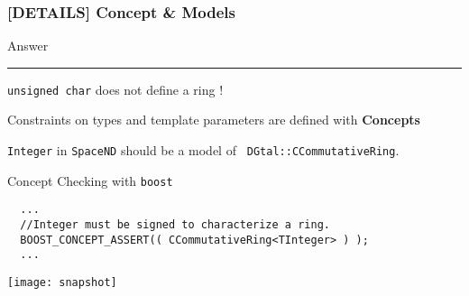 \documentclass[8pt]{beamer}
\newcommand{\HH}{ \vspace{0.5pt}\hrule}
\begin{document}
\begin{frame}[containsverbatim]
  \frametitle{[DETAILS] Concept \& Models}
  
  
  \begin{alertblock}{Answer\HH}
    \texttt{unsigned char} does not define a ring !
  \end{alertblock}

\vspace{0.5cm}

\begin{block}{}
  Constraints on types and template parameters are defined with {\bf
    Concepts}
\end{block}

\vspace{0.3cm}

{\tt Integer} in {\tt SpaceND} should be a model of {\tt
  DGtal::CCommutativeRing}.

\vspace{0.5cm}
Concept Checking  with {\tt boost}
\begin{lstlisting}
  ...
  //Integer must be signed to characterize a ring.
  BOOST_CONCEPT_ASSERT(( CCommutativeRing<TInteger> ) );
  ...
\end{lstlisting}



\end{frame}
\begin{frame}
  \centering \texttt{[image: snapshot]}
\end{frame}
\end{document}
